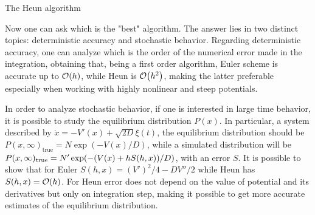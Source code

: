 \documentclass[../../master_thesis_np.tex]{subfiles}
\begin{document}
		\begin{algorithm}
			\caption{The Heun algorithm} \label{alg:heun}	
			\begin{algorithmic}[1]
				\EndFor
				\EndFor
			\end{algorithmic}
		\end{algorithm}
		Now one can ask which is the "best" algorithm. 
		The answer lies in two distinct topics: deterministic accuracy and stochastic behavior. 
		Regarding deterministic accuracy, one can analyze which is the order of the numerical error made in the integration, obtaining that, being a first order algorithm, Euler scheme is accurate up to $\order{h}$, while Heun is $\order{h^2}$, making the latter preferable especially when working with highly nonlinear and steep potentials.
		
		In order to analyze stochastic behavior, if one is interested in large time behavior, it is possible to study the equilibrium distribution $P(x)$. 
		In particular, a system described by $\dot{x} = -V'(x) + \sqrt{2D}\xi(t)$, the equilibrium distribution should be $P(x, \infty)_{\text{true}} = N \exp(-V(x)/D)$, while a simulated distribution will be $P(x, \infty)_{\text{true}} = N' \exp(-\qty(V(x) + hS(h,x))/D)$, with an error $S$. It is possible to show \cite{mannella_integration_2011} that for Euler $S(h,x) = (V')^2/4 - DV''/2$ while Heun has $S(h,x) = \order{h}$.
		For Heun error does not depend on the value of potential and its derivatives but only on integration step, making it possible to get more accurate estimates of the equilibrium distribution.%
		
\end{document}
